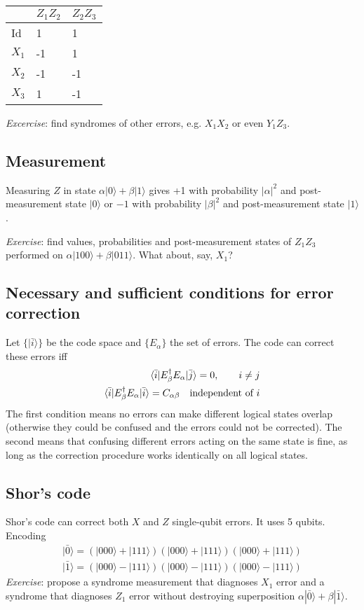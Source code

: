 \documentclass[12 pt]{article}
\begin{document}
\begin{tabular}{lll}
	& $Z_1 Z_2$ & $Z_2 Z_3$ \\ \hline
	Id   & 1         & 1         \\ \hline
	$X_1$ & -1        & 1         \\ \hline
	$X_2$ & -1        & -1       \\ \hline
	$X_3$ & 1         & -1       
\end{tabular}

\textit{Excercise}: find syndromes of other errors, e.g. $X_1X_2$ or even $Y_1 Z_3$.

\subsection{Measurement}
Measuring $Z$ in state $\alpha|0\rangle+\beta|1\rangle$ gives +1 with probability $|\alpha|^2$ and post-measurement state $|0\rangle$ or $-1$ with probability $|\beta|^2$ and post-measurement state $|1\rangle$. 

\textit{Exercise}: find values, probabilities and post-measurement states of $Z_1 Z_3$ performed on $\alpha|100\rangle+\beta|011\rangle$. What about, say, $X_1$?
\subsection{Necessary and sufficient conditions for error correction}

Let $\{|\bar{i}\rangle\}$ be the code space and $\{E_\alpha\}$ the set of errors. The code can correct these errors iff
\begin{align}
\braket{\bar{i}|E^\dagger_\beta E_\alpha|\bar{j}}=0,\qquad i\neq j\\
\braket{\bar{i}|E^\dagger_\beta E_\alpha|\bar{i}}=C_{\alpha\beta} \quad\text{independent of $i$}
\end{align}
The first condition means no errors can make different logical states overlap (otherwise they could be confused and the errors could not be corrected). The second means that confusing different errors acting on the same state is fine, as long as the correction procedure works identically on all logical states.
\subsection{Shor's code}
Shor's code can correct both $X$ and $Z$ single-qubit errors. It uses 5 qubits. Encoding
\begin{align}
|\bar{0}\rangle=(|000\rangle+|111\rangle)(|000\rangle+|111\rangle)(|000\rangle+|111\rangle)\\
|\bar{1}\rangle=(|000\rangle-|111\rangle)(|000\rangle-|111\rangle)(|000\rangle-|111\rangle)
\end{align}
\textit{Exercise}: propose a syndrome measurement that diagnoses $X_1$ error and a syndrome that diagnoses $Z_1$ error without destroying superposition $\alpha|\bar{0}\rangle+\beta|\bar{1}\rangle$.
\end{document}
